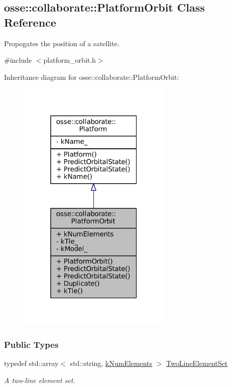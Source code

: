 \hypertarget{classosse_1_1collaborate_1_1_platform_orbit}{}\subsection{osse\+:\+:collaborate\+:\+:Platform\+Orbit Class Reference}
\label{classosse_1_1collaborate_1_1_platform_orbit}


Propogates the position of a satellite.  




{\ttfamily \#include $<$platform\+\_\+orbit.\+h$>$}



Inheritance diagram for osse\+:\+:collaborate\+:\+:Platform\+Orbit\+:
\nopagebreak
\begin{figure}[H]
\begin{center}
\leavevmode
\includegraphics[width=208pt]{classosse_1_1collaborate_1_1_platform_orbit__inherit__graph}
\end{center}
\end{figure}
\subsubsection*{Public Types}
\begin{DoxyCompactItemize}
\item 
\mbox{\label{classosse_1_1collaborate_1_1_platform_orbit_aeb5892b2982d26547cead0beebc81fe0}} 
typedef std\+::array$<$ std\+::string, \hyperlink{classosse_1_1collaborate_1_1_platform_orbit_a50b5b9308298c2a17db06a92b82abe85}{k\+Num\+Elements} $>$ \hyperlink{classosse_1_1collaborate_1_1_platform_orbit_aeb5892b2982d26547cead0beebc81fe0}{Two\+Line\+Element\+Set}
\begin{DoxyCompactList}\small\item\em A two-\/line element set. \end{DoxyCompactList}\end{DoxyCompactItemize}
